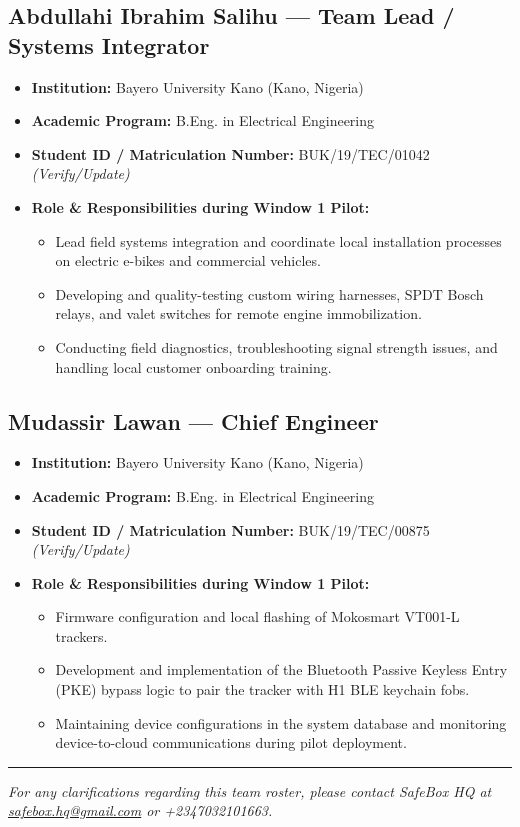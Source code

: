 \documentclass[11pt,a4paper]{article}
\begin{document}
\subsection{Abdullahi Ibrahim Salihu --- Team Lead / Systems Integrator}
\begin{itemize}
    \item \textbf{Institution:} Bayero University Kano (Kano, Nigeria)
    \item \textbf{Academic Program:} B.Eng. in Electrical Engineering
    \item \textbf{Student ID / Matriculation Number:} BUK/19/TEC/01042 \textit{(Verify/Update)}
    \item \textbf{Role \& Responsibilities during Window 1 Pilot:}
        \begin{itemize}
            \item Lead field systems integration and coordinate local installation processes on electric e-bikes and commercial vehicles.
            \item Developing and quality-testing custom wiring harnesses, SPDT Bosch relays, and valet switches for remote engine immobilization.
            \item Conducting field diagnostics, troubleshooting signal strength issues, and handling local customer onboarding training.
        \end{itemize}
\end{itemize}

\subsection{Mudassir Lawan --- Chief Engineer}
\begin{itemize}
    \item \textbf{Institution:} Bayero University Kano (Kano, Nigeria)
    \item \textbf{Academic Program:} B.Eng. in Electrical Engineering
    \item \textbf{Student ID / Matriculation Number:} BUK/19/TEC/00875 \textit{(Verify/Update)}
    \item \textbf{Role \& Responsibilities during Window 1 Pilot:}
        \begin{itemize}
            \item Firmware configuration and local flashing of Mokosmart VT001-L trackers.
            \item Development and implementation of the Bluetooth Passive Keyless Entry (PKE) bypass logic to pair the tracker with H1 BLE keychain fobs.
            \item Maintaining device configurations in the system database and monitoring device-to-cloud communications during pilot deployment.
        \end{itemize}
\end{itemize}

\vspace{0.5cm}
\rule{\linewidth}{0.5pt}
\vspace{0.2cm}

\begin{center}
    \textit{For any clarifications regarding this team roster, please contact SafeBox HQ at \href{mailto:safebox.hq@gmail.com}{safebox.hq@gmail.com} or +2347032101663.}
\end{center}
\end{document}
